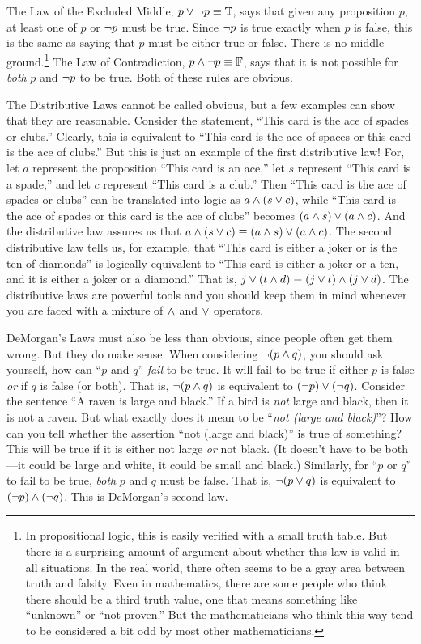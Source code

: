 The Law of the Excluded Middle, $p\vee\lnot p\equiv \mathbb{T}$,
says that given any proposition $p$, at
least one of $p$ or $\lnot p$ must be true.  Since $\lnot p$ is true 
exactly when $p$ is false, this is the same as saying that
$p$ must be either true or false.   There is no middle
ground.\footnote{In propositional logic, this is easily verified with
a small truth table.  But there is a surprising amount of argument about
whether this law is valid in all situations.  In the real world, there often
seems to be a gray area between truth and falsity.  Even in mathematics,
there are some people who think there should be a third truth value,
one that means something like ``unknown'' or ``not proven.''  But the
mathematicians who think this way tend to be considered a bit odd
by most other mathematicians.}  The Law of Contradiction,
$p\wedge\lnot p\equiv\mathbb{F}$, says that it is not possible for 
\emph{both} $p$ and $\lnot p$ to be true.  Both of these rules are obvious.

The Distributive Laws cannot be called obvious, but a few
examples can show that they are reasonable.  Consider the statement, ``This 
card is the ace of spades or clubs.''  Clearly, this is equivalent to ``This
card is the ace of spaces or this card is the ace of clubs.''  But this is
just an example of the first distributive law!  For, let $a$ represent the
proposition ``This card is an ace,'' let $s$ represent ``This card is a spade,''
and let $c$ represent ``This card is a club.''  Then ``This card is the ace of
spades or clubs'' can be translated into logic as $a\wedge(s\vee c)$, while
``This card is the ace of spades or this card is the ace of clubs'' becomes
$(a\wedge s)\vee (a\wedge c)$.  And the distributive law assures us that
$a\wedge(s\vee c)\equiv(a\wedge s)\vee (a\wedge c)$.  The second distributive
law tells us, for example, that ``This card is either a joker or is the ten of diamonds''
is logically equivalent to ``This card is either a joker or a ten, and it is either
a joker or a diamond.''  That is, $j\vee(t\wedge d)\equiv(j\vee t)\wedge(j\vee d)$.
The distributive laws are powerful
tools and you should keep them in mind whenever you are faced with a
mixture of $\wedge$ and $\vee$ operators.

DeMorgan's Laws must also be less than obvious, since people often get
them wrong.  But they do make sense.  When considering $\lnot(p\wedge q)$,
you should ask yourself, how can ``$p$ and $q$'' \emph{fail} to be true.
It will fail to be true if either $p$ is false \emph{or} if $q$ is false (or both).
That is, $\lnot(p \wedge q)$ is equivalent to $(\lnot p)\vee(\lnot q)$.  Consider
the sentence ``A raven is large and black.''  If a bird is \emph{not} large and black,
then it is not a raven.  But what exactly does it mean to be
``\emph{not (large and black)}''?  How can you tell whether the assertion ``not (large
and black)'' is true of something?  This will be true if it is either
not large \emph{or} not black.  (It doesn't have to be both---it could be
large and white, it could be small and black.)  Similarly, for ``$p$ or $q$''
to fail to be true, \emph{both} $p$ and $q$ must be false.  That
is, $\lnot(p\vee q)$ is equivalent to $(\lnot p)\wedge (\lnot q)$.  This is DeMorgan's
second law.

